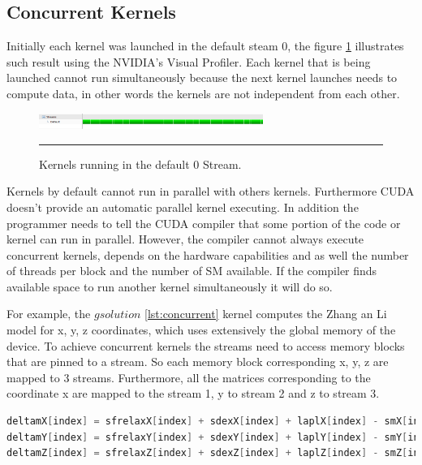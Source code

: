 \subsection{Concurrent Kernels}

Initially each kernel was launched in the default steam 0, the figure \ref{fig:streams} illustrates such result using the NVIDIA's Visual Profiler. Each kernel that is being launched cannot run simultaneously because the next kernel launches needs to compute data, in other words the kernels are not independent from each other.

\begin{figure}[htbp]
	\centering
		\includegraphics[width=0.65\textwidth]{Figures/ini_steams.png}
		\rule{35em}{0.2pt}
	\caption[Initial Streams]{Kernels running in the default 0 Stream.
}
	\label{fig:streams}
\end{figure}

 Kernels by default cannot run in parallel with others kernels. Furthermore CUDA doesn't provide an automatic parallel kernel executing. In addition the programmer needs to tell the CUDA compiler that some portion of the code or kernel can run in parallel. However, the compiler cannot always execute concurrent kernels, depends on the hardware capabilities and as well the number of threads per block and the number of SM available. If the compiler finds available space to run another kernel simultaneously it will do so. 

For example, the $gsolution$ \ref{lst:concurrent} kernel computes the Zhang an Li model for x, y, z coordinates, which uses extensively the global memory of the device. To achieve concurrent kernels the streams need to access memory blocks that are pinned to a stream. So each memory block corresponding x, y, z are mapped to 3 streams. Furthermore, all the matrices corresponding to the coordinate x are mapped to the stream 1, y to stream 2 and z to stream 3.

\begin{lstlisting}[language=C++, label={lst:concurrent}, caption={Evaluation of x, y, z coordinates of the Zhang and Li model in a single kernel.}]
deltamX[index] = sfrelaxX[index] + sdexX[index] + laplX[index] - smX[index];
deltamY[index] = sfrelaxY[index] + sdexY[index] + laplY[index] - smY[index];
deltamZ[index] = sfrelaxZ[index] + sdexZ[index] + laplZ[index] - smZ[index];
\end{lstlisting}
 
